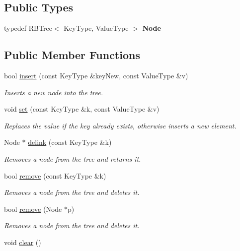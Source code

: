 \subsection*{Public Types}
\begin{DoxyCompactItemize}
\item 
typedef R\+B\+Tree$<$ Key\+Type, Value\+Type $>$ {\bfseries Node}\hypertarget{classirr_1_1core_1_1map_ab5900de54f7cce26c95de541dff483ff}{}\label{classirr_1_1core_1_1map_ab5900de54f7cce26c95de541dff483ff}

\end{DoxyCompactItemize}
\subsection*{Public Member Functions}
\begin{DoxyCompactItemize}
\item 
bool \hyperlink{classirr_1_1core_1_1map_af9f8f34cab620e3bdc1ae72715ab9d15}{insert} (const Key\+Type \&key\+New, const Value\+Type \&v)
\begin{DoxyCompactList}\small\item\em Inserts a new node into the tree. \end{DoxyCompactList}\item 
void \hyperlink{classirr_1_1core_1_1map_ae31213e9478dd259bdd79c7fd3249584}{set} (const Key\+Type \&k, const Value\+Type \&v)
\begin{DoxyCompactList}\small\item\em Replaces the value if the key already exists, otherwise inserts a new element. \end{DoxyCompactList}\item 
Node $\ast$ \hyperlink{classirr_1_1core_1_1map_a6f95533c709ef2dbe17148442aa26984}{delink} (const Key\+Type \&k)
\begin{DoxyCompactList}\small\item\em Removes a node from the tree and returns it. \end{DoxyCompactList}\item 
bool \hyperlink{classirr_1_1core_1_1map_a83d8a6261249668ae6a0f2bbd6e84c26}{remove} (const Key\+Type \&k)
\begin{DoxyCompactList}\small\item\em Removes a node from the tree and deletes it. \end{DoxyCompactList}\item 
bool \hyperlink{classirr_1_1core_1_1map_a8f8ee85b87b3764be03d78ba696e75f2}{remove} (Node $\ast$p)
\begin{DoxyCompactList}\small\item\em Removes a node from the tree and deletes it. \end{DoxyCompactList}\item 
void \hyperlink{classirr_1_1core_1_1map_a0f7e7fdbb5ec7794851e32c9716dace0}{clear} ()\hypertarget{classirr_1_1core_1_1map_a0f7e7fdbb5ec7794851e32c9716dace0}{}\label{classirr_1_1core_1_1map_a0f7e7fdbb5ec7794851e32c9716dace0}


\end{DoxyCompactItemize}
